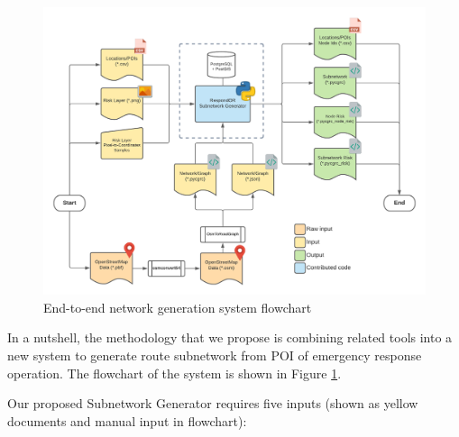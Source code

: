 \documentclass[conference]{IEEEtran}
\begin{document}
\begin{figure}
\centerline{\includegraphics[scale=0.6]{system-flowchart.png}}
\caption{End-to-end network generation system flowchart}
\label{fig_system_flowchart}
\end{figure}

In a nutshell, the methodology that we propose is combining related tools into a new system to generate route subnetwork from POI of emergency response operation. The flowchart of the system is shown in Figure \ref{fig_system_flowchart}.

Our proposed Subnetwork Generator requires five inputs (shown as yellow documents and manual input in flowchart):
\end{document}
